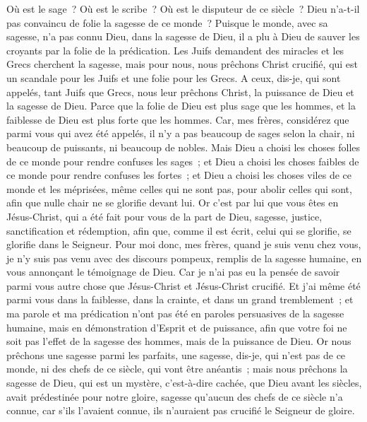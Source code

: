 \begin{multicols}{2}
Où est le sage~? Où est le scribe~? Où est le disputeur de ce siècle~? Dieu n'a-t-il pas convaincu de folie la sagesse de ce monde~?
Puisque le monde, avec sa sagesse, n'a pas connu Dieu, dans la sagesse de Dieu, il a plu à Dieu de sauver les croyants par la folie de la prédication.
Les Juifs demandent des miracles et les Grecs cherchent la sagesse,
mais pour nous, nous prêchons Christ crucifié, qui est un scandale pour les Juifs et une folie pour les Grecs.
A ceux, dis-je, qui sont appelés, tant Juifs que Grecs, nous leur prêchons Christ, la puissance de Dieu et la sagesse de Dieu.
Parce que la folie de Dieu est plus sage que les hommes, et la faiblesse de Dieu est plus forte que les hommes.
Car, mes frères, considérez que parmi vous qui avez été appelés, il n'y a pas beaucoup de sages selon la chair, ni beaucoup de puissants, ni beaucoup de nobles.
Mais Dieu a choisi les choses folles de ce monde pour rendre confuses les sages~; et Dieu a choisi les choses faibles de ce monde pour rendre confuses les fortes~;
et Dieu a choisi les choses viles de ce monde et les méprisées, même celles qui ne sont pas, pour abolir celles qui sont,
afin que nulle chair ne se glorifie devant lui.
Or c'est par lui que vous êtes en Jésus-Christ, qui a été fait pour vous de la part de Dieu, sagesse, justice, sanctification et rédemption,
afin que, comme il est écrit, celui qui se glorifie, se glorifie dans le Seigneur.
\VerseOne{}Pour moi donc, mes frères, quand je suis venu chez vous, je n'y suis pas venu avec des discours pompeux, remplis de la sagesse humaine, en vous annonçant le témoignage de Dieu.
Car je n'ai pas eu la pensée de savoir parmi vous autre chose que Jésus-Christ et Jésus-Christ crucifié.
Et j'ai même été parmi vous dans la faiblesse, dans la crainte, et dans un grand tremblement~;
et ma parole et ma prédication n'ont pas été en paroles persuasives de la sagesse humaine, mais en démonstration d'Esprit et de puissance,
afin que votre foi ne soit pas l'effet de la sagesse des hommes, mais de la puissance de Dieu.
Or nous prêchons une sagesse parmi les parfaits, une sagesse, dis-je, qui n'est pas de ce monde, ni des chefs de ce siècle, qui vont être anéantis~;
mais nous prêchons la sagesse de Dieu, qui est un mystère, c'est-à-dire cachée, que Dieu avant les siècles, avait prédestinée pour notre gloire,
sagesse qu'aucun des chefs de ce siècle n'a connue, car s'ils l'avaient connue, ils n'auraient pas crucifié le Seigneur de gloire.

\end{multicols}
